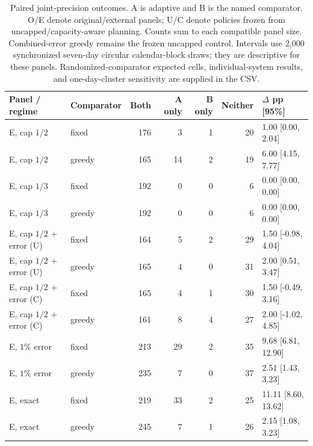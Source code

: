 \begin{table}[htbp]
\centering\scriptsize
\begin{tabular}{llrrrrl}
\toprule
Panel / regime & Comparator & Both & A only & B only & Neither & $\Delta$ pp [95\%]\\
\midrule
E, cap $1/2$ & fixed & 176 & 3 & 1 & 20 & 1.00 [0.00, 2.04]\\
E, cap $1/2$ & greedy & 165 & 14 & 2 & 19 & 6.00 [4.15, 7.77]\\
E, cap $1/3$ & fixed & 192 & 0 & 0 & 6 & 0.00 [0.00, 0.00]\\
E, cap $1/3$ & greedy & 192 & 0 & 0 & 6 & 0.00 [0.00, 0.00]\\
E, cap $1/2$ + error (U) & fixed & 164 & 5 & 2 & 29 & 1.50 [-0.98, 4.04]\\
E, cap $1/2$ + error (U) & greedy & 165 & 4 & 0 & 31 & 2.00 [0.51, 3.47]\\
E, cap $1/2$ + error (C) & fixed & 165 & 4 & 1 & 30 & 1.50 [-0.49, 3.16]\\
E, cap $1/2$ + error (C) & greedy & 161 & 8 & 4 & 27 & 2.00 [-1.02, 4.85]\\
E, $1\%$ error & fixed & 213 & 29 & 2 & 35 & 9.68 [6.81, 12.90]\\
E, $1\%$ error & greedy & 235 & 7 & 0 & 37 & 2.51 [1.43, 3.23]\\
E, exact & fixed & 219 & 33 & 2 & 25 & 11.11 [8.60, 13.62]\\
E, exact & greedy & 245 & 7 & 1 & 26 & 2.15 [1.08, 3.23]\\
\bottomrule
\end{tabular}
\caption{Paired joint-precision outcomes. A is adaptive and B is the named comparator. O/E denote original/external panels; U/C denote policies frozen from uncapped/capacity-aware planning. Counts sum to each compatible panel size. Combined-error greedy remains the frozen uncapped control. Intervals use 2,000 synchronized seven-day circular calendar-block draws; they are descriptive for these panels. Randomized-comparator expected cells, individual-system results, and one-day-cluster sensitivity are supplied in the CSV.}
\label{tab:joint_paired_outcomes}
\end{table}
